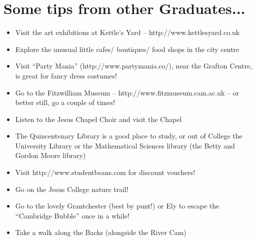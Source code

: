 \documentclass[11pt,fleqn, oneside]{book} %
\begin{document}
\section{Some tips from other Graduates...}
\begin{itemize}
\item{Visit the art exhibitions at Kettle’s Yard – http://www.kettlesyard.co.uk}
\item{Explore the unusual little cafes/ boutiques/ food shops in the city centre}
\item{Visit ``Party Mania'' (http://www.partymania.co/), near the Grafton Centre, is great for fancy dress costumes!}
\item{Go to the Fitzwilliam Museum – http://www.fitzmuseum.cam.ac.uk – or better still, go a couple of times!}
\item{Listen to the Jesus Chapel Choir and visit the Chapel}
\item{The Quincentenary Library is a good place to study, or out of College the University Library or the Mathematical Sciences library (the Betty and Gordon Moore library)}
\item{Visit  http://www.studentbeans.com for discount vouchers!}
\item{Go on the Jesus College nature trail!}
\item{Go to the lovely Grantchester (best by punt!) or Ely to escape the “Cambridge Bubble” once in a while!}
\item{Take a walk along the Backs (alongside the River Cam)}
\end{itemize}
\end{document}
